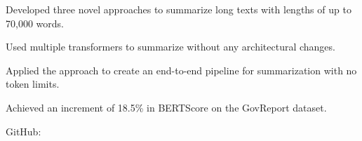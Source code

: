 \begin{resume_list}
  \item Developed three novel approaches to summarize long texts with lengths of up to 70,000 words.
  \item Used multiple transformers to summarize without any architectural changes.
  \item Applied the approach to create an end-to-end pipeline for summarization with no token limits.
  \item Achieved an increment of 18.5\% in BERTScore on the GovReport dataset.
  \item GitHub: 
\end{resume_list}
